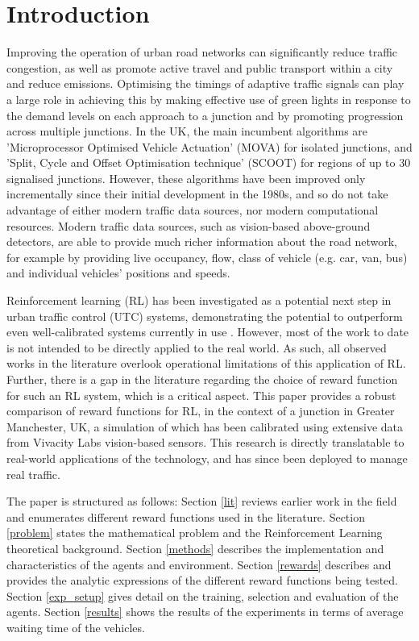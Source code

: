 \documentclass{article}
\begin{document}
\section{Introduction}
Improving the operation of urban road networks can significantly reduce traffic congestion, as well as promote active travel and public transport within a city and reduce emissions.
Optimising the timings of adaptive traffic signals can play a large role in achieving this by making effective use of green lights in response to the demand levels on each approach to a junction and by promoting progression across multiple junctions.
In the UK, the main incumbent algorithms are 'Microprocessor Optimised Vehicle Actuation' (MOVA) \cite{MOVA} for isolated junctions, and 'Split, Cycle and Offset Optimisation technique' (SCOOT) \cite{SCOOT} for regions of  up to 30 signalised junctions.
However, these algorithms have been improved only incrementally since their initial development in the 1980s, and so do not take advantage of either modern traffic data sources, nor modern computational resources. Modern traffic data sources, such as vision-based above-ground detectors, are able to provide much richer information about the road network, for example by providing live occupancy, flow, class of vehicle (e.g. car, van, bus) and individual vehicles' positions and speeds.

Reinforcement learning (RL) has been investigated as a potential next step in urban traffic control (UTC) systems, demonstrating the potential to outperform even well-calibrated systems currently in use \cite{wei2019a}.
However, most of the work to date is not intended to be directly applied to the real world. As such, all observed works in the literature overlook operational limitations of this application of RL.
Further, there is a gap in the literature regarding the choice of reward function for such an RL system, which is a critical aspect.
This paper provides a robust comparison of reward functions for RL, in the context of a junction in Greater Manchester, UK, a simulation of which has been calibrated using extensive data from Vivacity Labs vision-based sensors.
This research is directly translatable to real-world applications of the technology, and has since been deployed to manage real traffic. 

The paper is structured as follows: Section \ref{lit} reviews earlier work in the field and enumerates different reward functions used in the literature.
Section \ref{problem} states the mathematical problem and the Reinforcement Learning theoretical background.
Section \ref{methods} describes the implementation and characteristics of the agents and environment.
Section \ref{rewards} describes and provides the analytic expressions of the different reward functions being tested.
Section \ref{exp_setup} gives detail on the training, selection and evaluation of the agents.
Section \ref{results} shows the results of the experiments in terms of average waiting time of the vehicles.
\end{document}
